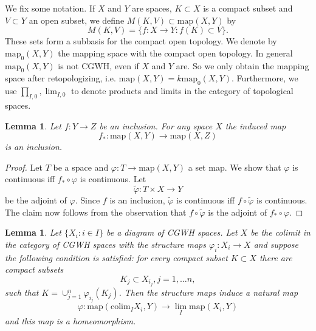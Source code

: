 \documentclass[8pt, oneside]{article}
\newtheorem{lem}[thm]{Lemma}
\theoremstyle{definition}
\newcommand{\colim}{\mathrm{colim}}
\newcommand{\map}{\mathrm{map}}
\begin{document}
We fix some notation. If $X$ and $Y$ are spaces, $K\subset X$ is a compact subset
and $V\subset Y$ an open subset, we define $M(K,V)\subset \mathrm{map}(X,Y)$
by
$$M(K,V) = \{f:X\rightarrow Y: f(K)\subset V\}.$$
These sets form a subbasis for the compact open topology.
We denote by $\map_0(X,Y)$ the mapping space with the compact open topology.
In general $\map_0(X,Y)$ is not CGWH, even if $X$ and $Y$ are. So we
only obtain the mapping space after retopologizing, i.e.
$\map(X,Y) = k\map_0(X,Y)$. Furthermore, we use $\prod_{I,0}, \lim_{I,0}$
to denote products and limits in the category of topological spaces.
\begin{lem}\label{lem:mapinclusion}
Let $f:Y\to Z$ be an inclusion. For any space $X$ the induced map
$$f_\ast:\mathrm{map}(X,Y)\to \map(X,Z)$$
is an inclusion.
\end{lem}

\begin{proof}
Let $T$ be a space and $\varphi:T\rightarrow \map(X,Y)$ a set map.
We show that $\varphi$ is continuous iff $f_\ast\circ\varphi$ is continuous.
Let $$\tilde \varphi:T\times X\rightarrow Y$$
be the adjoint of $\varphi$. Since $f$ is an inclusion, $\tilde \varphi$
is continuous iff $f\circ \tilde\varphi$ is continuous. The claim now follows
from the observation that $f\circ \tilde\varphi$ is the adjoint of
$f_\ast\circ\varphi$.
\end{proof}

\begin{lem}\label{lem:maprepresentable}
Let 
$\{X_i: i\in I\}$
be a diagram of CGWH spaces. Let $X$ be the colimit 
in the category of CGWH spaces with the structure maps
$\varphi_i:X_i \to X$ and suppose the following condition is satisfied:
for every compact subset $K\subset X$ there are compact subsets
$$K_{j}\subset X_{i_j}, j=1,\ldots n,$$ such that
$K = \cup_{j=1}^n \varphi_{i_j}(K_{j})$.
Then the structure maps induce a natural map 
$$\varphi: \mathrm{map}(\colim_I X_i, Y)\to \lim_I
\mathrm{map}(X_i, Y)$$
and this map is a homeomorphism.
\end{lem}
\end{document}
